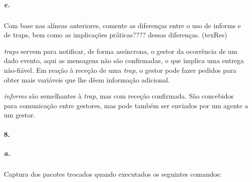 \subparagraph{e.}
Com base nas alíneas anteriores, comente as diferenças entre o uso de informs e de traps, bem como as implicações práticas???? dessas diferenças. (texRes)

\emph{traps} servem para notificar, de forma assíncrona, o gestor da ocorrência de um dado evento, aqui as mensagens não são confirmadas, o que implica uma entrega não-fiável. Em reação à receção de uma \emph{trap}, o gestor pode fazer pedidos para
obter mais variáveis que lhe dêem informação adicional.

\emph{informs} são semelhantes à \emph{trap}, mas com receção confirmada. São concebidos para comunicação entre gestores, mas pode também ser enviados por um agente a um gestor.


\paragraph{8.}

\subparagraph{a.}
Captura dos pacotes trocados quando executados os seguintes comandos:

